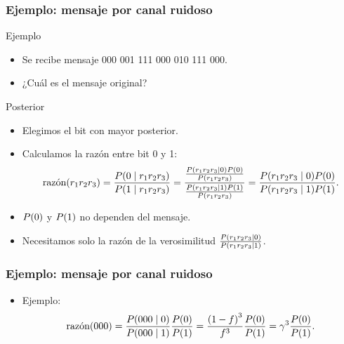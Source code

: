 \documentclass[table]{beamer}
\begin{document}
\begin{frame}
    \frametitle{Ejemplo: mensaje por canal ruidoso}
    \begin{block}{Ejemplo}
        \begin{itemize}
            \item Se recibe mensaje 000 001 111 000 010 111 000.
            \item ¿Cuál es el mensaje original?
        \end{itemize}
    \end{block}
    \begin{block}{Posterior}
        \begin{itemize}
            \item Elegimos el bit con mayor posterior.
            \item Calculamos la razón entre bit 0 y 1:
                \begin{equation*}
                    \text{razón} \parens{r_{1} r_{2} r_{3}} = \frac{\prob{0 \mid r_{1} r_{2} r_{3}}}{\prob{1 \mid r_{1} r_{2} r_{3}}} =
                    \frac{\frac{\prob{r_{1} r_{2} r_{3} \mid 0} \prob{0}}{\prob{r_{1} r_{2} r_{3}}}}{\frac{\prob{r_{1} r_{2} r_{3} \mid 1} \prob{1}}{\prob{r_{1} r_{2} r_{3}}}}
                    = \frac{\prob{r_{1} r_{2} r_{3} \mid 0} \prob{0}}{\prob{r_{1} r_{2} r_{3} \mid 1} \prob{1}} .
                \end{equation*}
            \item $\prob{0}$ y $\prob{1}$ no dependen del mensaje.
            \item Necesitamos solo la razón de la verosimilitud $\frac{\prob{r_{1} r_{2} r_{3} \mid 0}}{\prob{r_{1} r_{2} r_{3} \mid 1}}$.
        \end{itemize}
    \end{block}
\end{frame}

\begin{frame}
\frametitle{Ejemplo: mensaje por canal ruidoso}
\begin{itemize}
\item Ejemplo:
                \begin{equation*}
                    \text{razón} \parens{000}
                    = \frac{\prob{000 \mid 0}}{\prob{000 \mid 1}} \frac{\prob{0}}{\prob{1}}
                    = \frac{\parens{1 - f}^{3}}{f^{3}}
                    \frac{\prob{0}}{\prob{1}}
                    = \gamma^{3} \frac{\prob{0}}{\prob{1}} .
                \end{equation*}
\end{itemize}

\end{frame}
\end{document}
